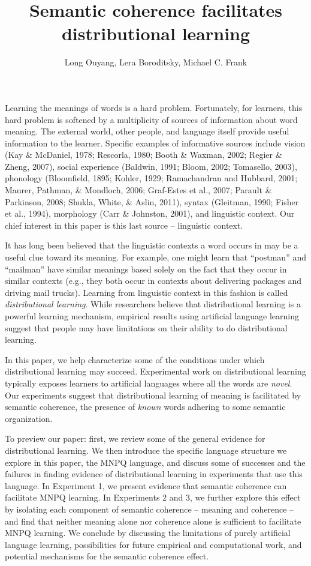 \documentclass[man,floatsintext]{apa6}
\title{Semantic coherence facilitates distributional learning}
\author{Long Ouyang, Lera Boroditsky, Michael C. Frank}
\affiliation{Stanford University}
\begin{document}
\maketitle

Learning the meanings of words is a hard problem. Fortunately, for
learners, this hard problem is softened by a multiplicity of sources
of information about word meaning. The external world, other people,
and language itself provide useful information to the
learner. Specific examples of informative sources include vision (Kay
\& McDaniel, 1978; Rescorla, 1980; Booth \& Waxman, 2002; Regier \&
Zheng, 2007), social experience (Baldwin, 1991; Bloom, 2002;
Tomasello, 2003), phonology (Bloomfield, 1895; Kohler, 1929;
Ramachandran and Hubbard, 2001; Maurer, Pathman, \& Mondloch, 2006;
Graf-Estes et al., 2007; Parault \& Parkinson, 2008; Shukla, White, \&
Aslin, 2011), syntax (Gleitman, 1990; Fisher et al., 1994), morphology
(Carr \& Johnston, 2001), and linguistic context. Our chief interest
in this paper is this last source -- linguistic context.

It has long been believed that the linguistic contexts a word occurs
in may be a useful clue toward its meaning. For example, one might
learn that ``postman'' and ``mailman'' have similar meanings based
solely on the fact that they occur in similar contexts (e.g., they
both occur in contexts about delivering packages and driving mail
trucks). Learning from linguistic context in this fashion is called
\emph{distributional learning}. While researchers believe that
distributional learning is a powerful learning mechanism, empirical
results using artificial language learning suggest that people may
have limitations on their ability to do distributional learning.
 
In this paper, we help characterize some of the conditions under which
distributional learning may succeed. Experimental work on
distributional learning typically exposes learners to artificial
languages where all the words are \emph{novel}. Our experiments
suggest that distributional learning of meaning is facilitated by
semantic coherence, the presence of \emph{known} words adhering to
some semantic organization.

To preview our paper: first, we review some of the general evidence
for distributional learning. We then introduce the specific language
structure we explore in this paper, the MNPQ language, and discuss
some of successes and the failures in finding evidence of
distributional learning in experiments that use this language. In
Experiment 1, we present evidence that semantic coherence can
facilitate MNPQ learning. In Experiments 2 and 3, we further explore
this effect by isolating each component of semantic coherence --
meaning and coherence -- and find that neither meaning alone nor
coherence alone is sufficient to facilitate MNPQ learning. We conclude
by discussing the limitations of purely artificial language learning,
possibilities for future empirical and computational work, and
potential mechanisms for the semantic coherence effect.
\end{document}
